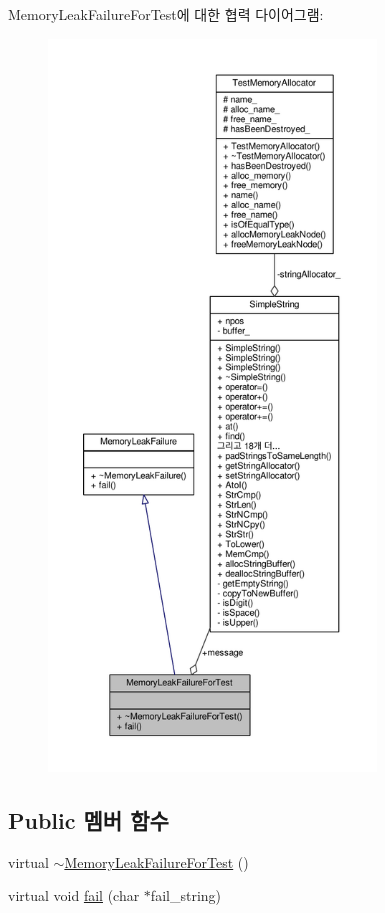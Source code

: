 Memory\+Leak\+Failure\+For\+Test에 대한 협력 다이어그램\+:
\nopagebreak
\begin{figure}[H]
\begin{center}
\leavevmode
\includegraphics[height=550pt]{class_memory_leak_failure_for_test__coll__graph}
\end{center}
\end{figure}
\subsection*{Public 멤버 함수}
\begin{DoxyCompactItemize}
\item 
virtual \hyperlink{class_memory_leak_failure_for_test_adfef23d81f3902ae419d7289927a5b66}{$\sim$\+Memory\+Leak\+Failure\+For\+Test} ()
\item 
virtual void \hyperlink{class_memory_leak_failure_for_test_ab0c95182b8a5af802640f434a32f1943}{fail} (char $\ast$fail\+\_\+string)
\end{DoxyCompactItemize}
